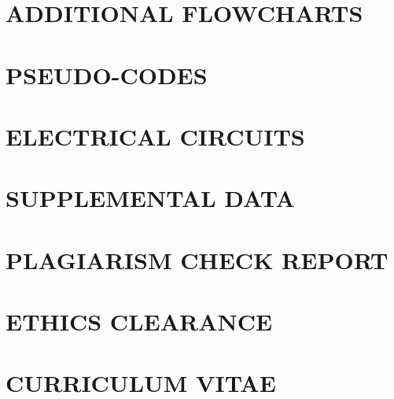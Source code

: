 \documentclass[reqno,12pt,onecolumn]{report}
\begin{document}
\chapter{ADDITIONAL FLOWCHARTS}

\newpage
\chapter{PSEUDO-CODES}

\newpage
\chapter{ELECTRICAL CIRCUITS}

\newpage
\chapter{SUPPLEMENTAL DATA}

\newpage
\chapter{PLAGIARISM CHECK REPORT}

\newpage
\chapter{ETHICS CLEARANCE}

\newpage
\chapter{CURRICULUM VITAE}

\newpage

\end{document}
